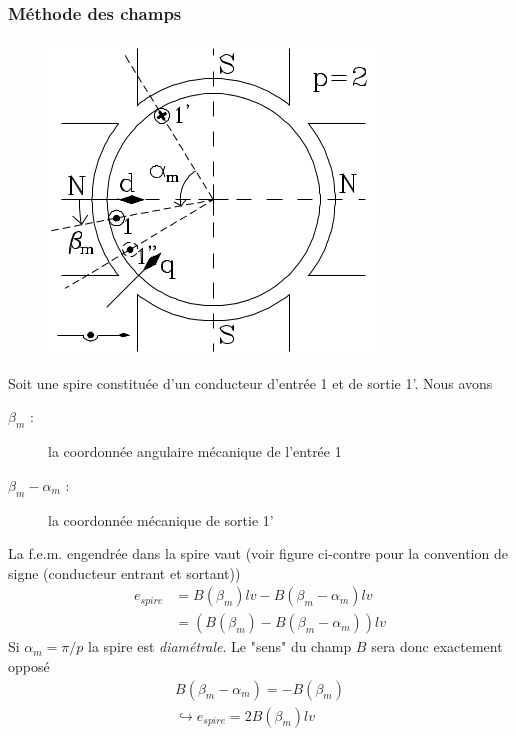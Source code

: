 		\subsubsection{Méthode des champs}
		\begin{figure}
		\vspace{-5mm}
		\includegraphics[scale=0.4]{ch4/image3.png}
		\end{figure}
		Soit une spire constituée d'un conducteur d'entrée 1 et de sortie 
		1'. Nous avons
		\begin{description}
		\item[$\beta_m$ :] la coordonnée angulaire mécanique de l'entrée 1
		\item[$\beta_m-\alpha_m$ :] la coordonnée mécanique de sortie 1'
		\end{description}				
		La f.e.m. engendrée dans la spire vaut (voir figure ci-contre pour 
		la convention de signe (conducteur entrant et sortant))
		\begin{equation}
		\begin{array}{ll}
		e_{spire} &= B(\beta_m)lv - B(\beta_m-\alpha_m)lv\\
		&= (B(\beta_m)-B(\beta_m-\alpha_m))lv
		\end{array}
		\end{equation}
		Si $\alpha_m = \pi/p$ la spire est \textit{diamétrale}. Le "sens" 
		du champ $B$ sera donc exactement opposé
		\begin{equation}
		\begin{array}{l}
		B(\beta_m-\alpha_m) = - B(\beta_m)\\
		\hookrightarrow e_{spire} = 2B(\beta_m)lv
		\end{array}
		\end{equation}
